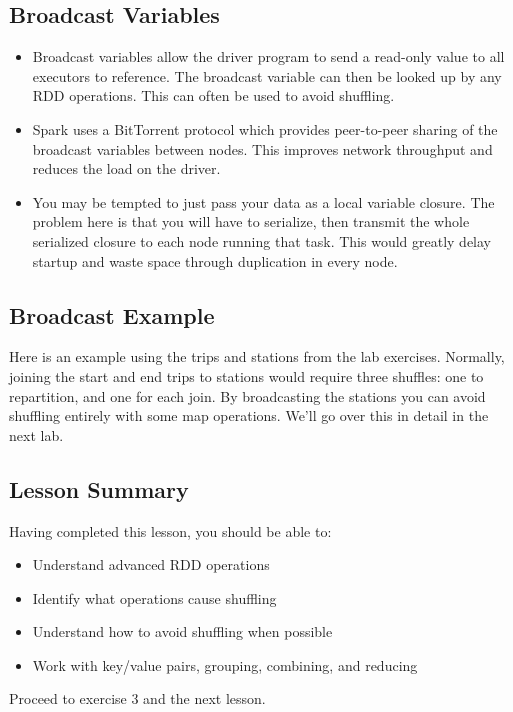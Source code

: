 \documentclass[a4paper,12pt]{article}
\begin{document}
\subsection*{Broadcast Variables}
\begin{itemize}
\item Broadcast variables allow the driver program to send a read-only value to all executors to reference. The
broadcast variable can then be looked up by any RDD operations. This can often be used to avoid
shuffling.
\item Spark uses a BitTorrent protocol which provides peer-to-peer sharing of the broadcast variables
between nodes. This improves network throughput and reduces the load on the driver.
\item You may be tempted to just pass your data as a local variable closure. The problem here is that you will
have to serialize, then transmit the whole serialized closure to each node running that task. This would
greatly delay startup and waste space through duplication in every node.
\end{itemize}
\subsection*{Broadcast Example}
Here is an example using the trips and stations from the lab exercises. Normally, joining the start and
end trips to stations would require three shuffles: one to repartition, and one for each join. By
broadcasting the stations you can avoid shuffling entirely with some map operations. We’ll go over this
in detail in the next lab.
\subsection*{Lesson Summary}
Having completed this lesson, you should be able to:
\begin{itemize}
\item Understand advanced RDD operations
\item Identify what operations cause shuffling
\item Understand how to avoid shuffling when possible
\item Work with key/value pairs, grouping, combining, and reducing
\end{itemize}
Proceed to exercise 3 and the next lesson.
\end{document}
